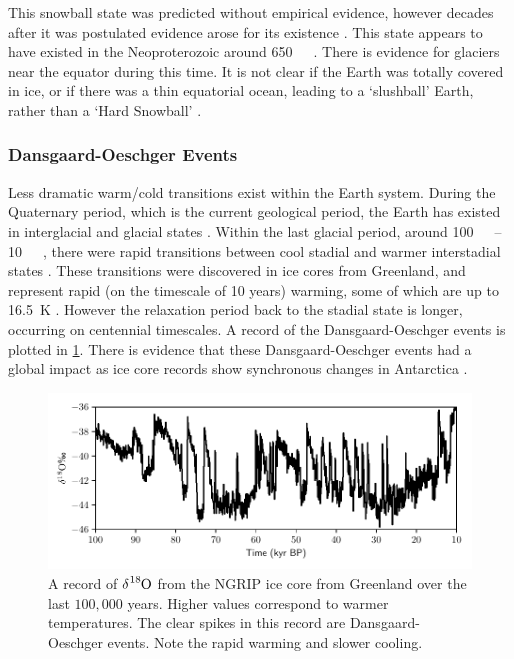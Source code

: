 This snowball state was predicted without empirical evidence, however decades after it was postulated evidence arose for its existence \parencite{Kirschvink1992,Hoffman2002}.
This state appears to have existed in the Neoproterozoic around \SI{650}{\mega\year\beforepresent}.
There is evidence for glaciers near the equator during this time. It is not clear
if the Earth was totally covered in ice, or if there was a thin equatorial ocean, leading to a `slushball' Earth, rather than a `Hard Snowball' \parencite{Pierrehumbert2005,Pierrehumbert2011}.

\subsubsection{Dansgaard-Oeschger Events}
Less dramatic warm/cold transitions exist within the Earth system. During the Quaternary period, which is the current geological period, the Earth has existed in
interglacial and glacial states \parencite{Lisiecki2005}. Within the last glacial period,
around \SIrange{100}{10}{\kilo\year\beforepresent}, there were rapid transitions between cool stadial and warmer interstadial states \parencite{Oeschger1984,Dansgaard1993}. These transitions were discovered
in ice cores from Greenland, and represent rapid (on the timescale of 10 years) warming, some of which are up to \SI{16.5}{\kelvin} \parencite{Kindler2014}. However the relaxation period
back to the stadial state is longer, occurring on centennial timescales. A record of the Dansgaard-Oeschger events is plotted in \cref{fig:ngrip}. There is evidence that these Dansgaard-Oeschger events
had a global impact as ice core records show synchronous changes in Antarctica \parencite{Buizert2015}.

\begin{figure}
  \centering
  \includegraphics[width=\textwidth,keepaspectratio]{ngrip}
  \caption[NGRIP record of Dansgaard Oeschger events]{A record of $\delta \ce{^{18}O}$ from the NGRIP ice core from Greenland \parencite{NGRIP2004} over the last $100,000$ years.
    Higher values correspond to warmer temperatures. The clear spikes in this record are Dansgaard-Oeschger events. Note the rapid warming and slower cooling.}
  \label{fig:ngrip}
\end{figure}


